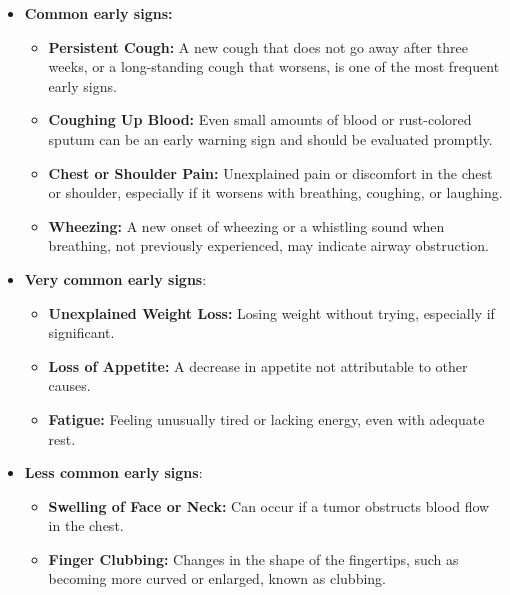 \begin{itemize}
    \item \textbf{Common early signs:}
        \begin{itemize}
            \item \textbf{Persistent Cough:} A new cough that does not go away after three weeks, 
            or a long-standing cough that worsens, is one of the most frequent early signs.

            \item \textbf{Coughing Up Blood:} Even small amounts of blood or rust-colored sputum 
            can be an early warning sign and should be evaluated promptly.
    
            \item \textbf{Chest or Shoulder Pain:} Unexplained pain or discomfort in the chest or 
            shoulder, especially if it worsens with breathing, coughing, or laughing.
        
            \item \textbf{Wheezing:} A new onset of wheezing or a whistling sound when breathing, 
            not previously experienced, may indicate airway obstruction.
        \end{itemize}
    
    \newpage
    \item \textbf{Very common early signs}:
        \begin{itemize}
            \item \textbf{Unexplained Weight Loss:} Losing weight without trying, especially if 
            significant.

            \item \textbf{Loss of Appetite:} A decrease in appetite not attributable to other 
            causes.
    
            \item \textbf{Fatigue:} Feeling unusually tired or lacking energy, even with adequate 
            rest.
        \end{itemize}
    
    \item \textbf{Less common early signs}:
        \begin{itemize}
            \item \textbf{Swelling of Face or Neck:} Can occur if a tumor obstructs blood flow in 
            the chest.

            \item \textbf{Finger Clubbing:} Changes in the shape of the fingertips, such as 
            becoming more curved or enlarged, known as clubbing.
        \end{itemize}
\end{itemize}

